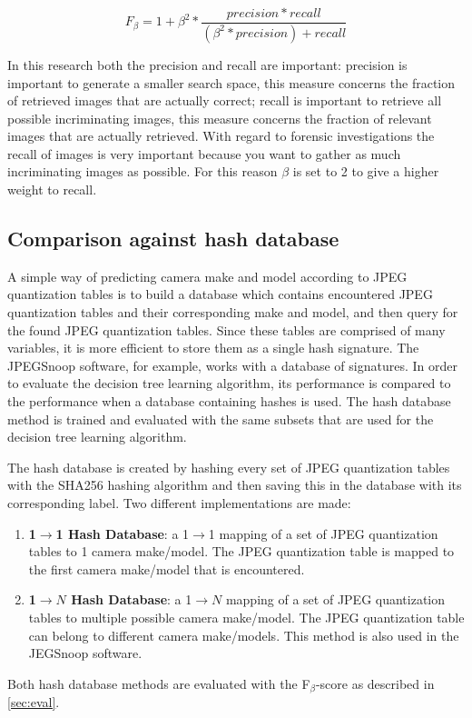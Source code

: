 \begin{equation}\label{eq:1}
F_\beta = 1 + \beta^{2} * \frac{precision * recall}{(\beta^{2} *precision) + recall}
\end{equation}

In this research both the precision and recall are important: precision is important to generate a smaller search space, this measure concerns the fraction of retrieved images that are actually correct; recall is important to retrieve all possible incriminating images, this measure concerns the fraction of relevant images that are actually retrieved. With regard to forensic investigations the recall of images is very important because you want to gather as much incriminating images as possible. For this reason $\beta$ is set to 2 to give a higher weight to recall. 

\subsection{Comparison against hash database}
A simple way of predicting camera make and model according to JPEG quantization tables is to build a database which contains encountered JPEG quantization tables and their corresponding make and model, and then query for the found JPEG quantization tables. Since these tables are comprised of many variables, it is more efficient to store them as a single hash signature. The JPEGSnoop software, for example, works with a database of signatures. In order to evaluate the decision tree learning algorithm, its performance is compared to the performance when a database containing hashes is used. The hash database method is trained and evaluated with the same subsets that are used for the decision tree learning algorithm. 

The hash database is created by hashing every set of JPEG quantization tables with the SHA256 hashing algorithm and then saving this in the database with its corresponding label. Two different implementations are made:
\begin{enumerate}
\item \textbf{1$\rightarrow$1 Hash Database}: a 1$\rightarrow$1 mapping of a set of JPEG quantization tables to 1 camera make/model. The JPEG quantization table is mapped to the first camera make/model that is encountered.
\item \textbf{1$\rightarrow N$ Hash Database}: a 1$\rightarrow N$ mapping of a set of JPEG quantization tables to multiple possible camera make/model. The JPEG quantization table can belong to different camera make/models. This method is also used in the JEGSnoop software. 
\end{enumerate}

Both hash database methods are evaluated with the F$_\beta$-score as described in \autoref{sec:eval}.